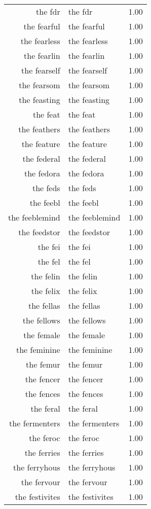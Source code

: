 \begin{table}[ht]
\begin{tabular}{rlr}
  the fdr & the fdr & 1.00 \\ 
  the fearful & the fearful & 1.00 \\ 
  the fearless & the fearless & 1.00 \\ 
  the fearlin & the fearlin & 1.00 \\ 
  the fearself & the fearself & 1.00 \\ 
  the fearsom & the fearsom & 1.00 \\ 
  the feasting & the feasting & 1.00 \\ 
  the feat & the feat & 1.00 \\ 
  the feathers & the feathers & 1.00 \\ 
  the feature & the feature & 1.00 \\ 
  the federal & the federal & 1.00 \\ 
  the fedora & the fedora & 1.00 \\ 
  the feds & the feds & 1.00 \\ 
  the feebl & the feebl & 1.00 \\ 
  the feeblemind & the feeblemind & 1.00 \\ 
  the feedstor & the feedstor & 1.00 \\ 
  the fei & the fei & 1.00 \\ 
  the fel & the fel & 1.00 \\ 
  the felin & the felin & 1.00 \\ 
  the felix & the felix & 1.00 \\ 
  the fellas & the fellas & 1.00 \\ 
  the fellows & the fellows & 1.00 \\ 
  the female & the female & 1.00 \\ 
  the feminine & the feminine & 1.00 \\ 
  the femur & the femur & 1.00 \\ 
  the fencer & the fencer & 1.00 \\ 
  the fences & the fences & 1.00 \\ 
  the feral & the feral & 1.00 \\ 
  the fermenters & the fermenters & 1.00 \\ 
  the feroc & the feroc & 1.00 \\ 
  the ferries & the ferries & 1.00 \\ 
  the ferryhous & the ferryhous & 1.00 \\ 
  the fervour & the fervour & 1.00 \\ 
  the festivites & the festivites & 1.00 \\ 

\end{tabular}
\end{table}
